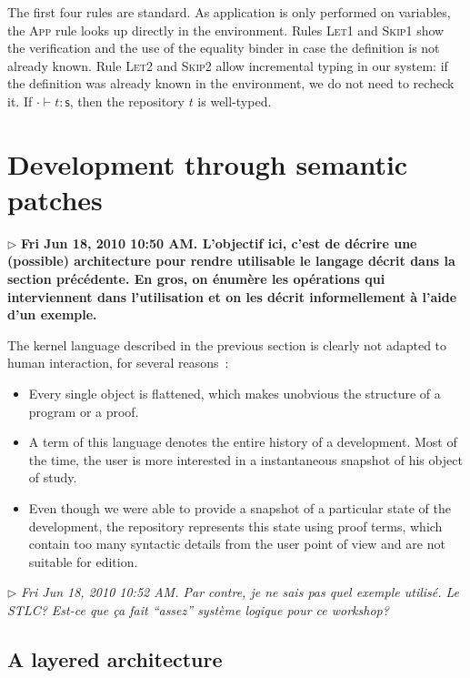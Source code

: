 \documentclass{article}
\newcommand{\sort}{\textsf{s}}
\newcommand{\remplan}[1]{\noindent\textcolor{bwblue}{$\triangleright$ \textbf{#1}}}
\newcommand{\remtext}[1]{\textcolor{bwgreen}{$\triangleright$ \textsl{#1}}}
\begin{document}
The first four rules are standard. As application is only performed on
variables, the \textsc{App} rule looks up directly in the
environment. Rules \textsc{Let1} and \textsc{Skip1} show the
verification and the use of the equality binder in case the definition
is not already known. Rule \textsc{Let2} and \textsc{Skip2} allow
incremental typing in our system: if the definition was already known
in the environment, we do not need to recheck it. If $\cdot\vdash
t:\sort$, then the repository $t$ is well-typed.

\section{Development through semantic patches}
\label{devel}

\remplan{Fri Jun 18, 2010 10:50 AM. L'objectif ici, c'est de décrire
  une (possible) architecture pour rendre utilisable le langage 
  décrit dans la section précédente. En gros, on énumère les 
  opérations qui interviennent dans l'utilisation et on les décrit
  informellement à l'aide d'un exemple.}

The kernel language described in the previous section is clearly not
adapted to human interaction, for several reasons~: 
\begin{itemize}

\item Every single object is flattened, which makes unobvious the
  structure of a program or a proof. 

\item A term of this language denotes the entire history of a
  development. Most of the time, the user is more interested in a
  instantaneous snapshot of his object of study.

\item Even though we were able to provide a snapshot of a particular
  state of the development, the repository represents this state 
  using proof terms, which contain too many syntactic details from the
  user point of view and are not suitable for edition.  

\end{itemize}

\remtext{Fri Jun 18, 2010 10:52 AM. Par contre, je ne sais pas quel
  exemple utilisé. Le STLC? Est-ce que ça fait ``assez'' système
  logique pour ce workshop?}

\subsection{A layered architecture}
\end{document}
